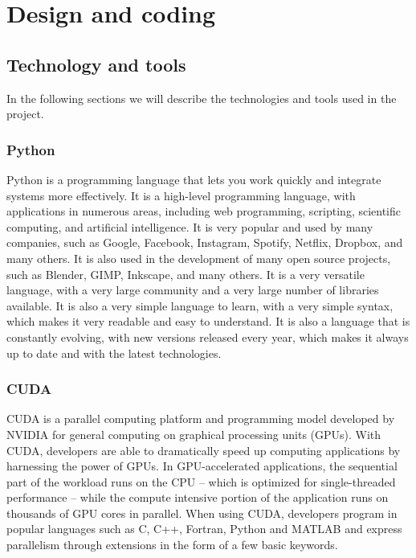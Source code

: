 \chapter{Design and coding}
\label{cap:design-coding}



\section{Technology and tools}
\label{sec:technology-tools}

In the following sections we will describe the technologies and tools used in
the project.
\subsection*{Python}
\label{subsec:python}
Python is a programming language that lets you work quickly and integrate
systems more effectively. It is a high-level programming language, with
applications in numerous areas, including web programming, scripting, scientific
computing, and artificial intelligence. It is very popular and used by many
companies, such as Google, Facebook, Instagram, Spotify, Netflix, Dropbox, and
many others. It is also used in the development of many open source projects,
such as Blender, GIMP, Inkscape, and many others. It is a very versatile
language, with a very large community and a very large number of libraries
available. It is also a very simple language to learn, with a very simple
syntax, which makes it very readable and easy to understand. It is also a
language that is constantly evolving, with new versions released every year,
which makes it always up to date and with the latest technologies.

\subsection*{CUDA}
\label{subsec:cuda}
CUDA is a parallel computing platform and programming model developed by NVIDIA
for general computing on graphical processing units (GPUs). With CUDA, developers
are able to dramatically speed up computing applications by harnessing the power
of GPUs. In GPU-accelerated applications, the sequential part of the workload
runs on the CPU – which is optimized for single-threaded performance – while the
compute intensive portion of the application runs on thousands of GPU cores in
parallel. When using CUDA, developers program in popular languages such as C,
C++, Fortran, Python and MATLAB and express parallelism through extensions in
the form of a few basic keywords.

